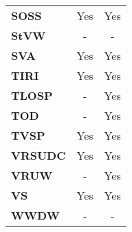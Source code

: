 \begin{table}[ht!]
\begin{tabular}{lcc}
\textbf{SOSS}                 & Yes                & Yes           \\
\textbf{StVW}                 & -                  & -             \\
\textbf{SVA}                  & Yes                & Yes           \\
\textbf{TIRI}                 & Yes                & Yes           \\
\textbf{TLOSP}                & -                  & Yes           \\
\textbf{TOD}                  & -                  & Yes           \\
\textbf{TVSP}                 & Yes                & Yes           \\
\textbf{VRSUDC}               & Yes                & Yes           \\
\textbf{VRUW}                 & -                  & Yes           \\
\textbf{VS}                   & Yes                & Yes           \\
\textbf{WWDW}                 & -                  & -             \\
\hline
\end{tabular}
\end{table}

